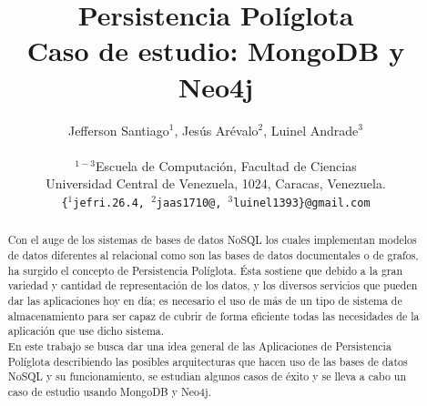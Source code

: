 \documentclass[conference]{IEEEtran}
\begin{document}
\title{Persistencia Pol\'iglota\\Caso de estudio: MongoDB y Neo4j}

\author{
Jefferson Santiago$^{1}$, Jes\'us Ar\'evalo$^{2}$, Luinel Andrade$^{3}$\\ \\
\small{$^{1-3}$Escuela de Computaci\'on, Facultad de Ciencias}\\
\small{Universidad Central de Venezuela, 1024, Caracas, Venezuela.}\\
\small{\texttt{\{$^{1}$jefri.26.4, $^{2}$jaas1710@, $^{3}$luinel1393\}@gmail.com}} %
}


\maketitle


\begin{abstract}
Con el auge de los sistemas de bases de datos NoSQL los cuales implementan modelos de datos diferentes al relacional como son las bases de datos documentales o de grafos, ha surgido el concepto  de Persistencia Pol\'iglota. \'Esta sostiene que debido a la gran variedad y cantidad de representación de los datos, y los diversos servicios que pueden dar las aplicaciones hoy en d\'ia; es necesario el uso de m\'as de un tipo de sistema de almacenamiento para ser capaz de cubrir de forma eficiente todas las necesidades de la aplicaci\'on que use dicho sistema.\\
En este trabajo se busca dar una idea general de las Aplicaciones de Persistencia Pol\'iglota describiendo las posibles arquitecturas  que hacen uso de las bases de datos NoSQL y su funcionamiento, se estudian algunos casos de \'exito  y se lleva a cabo un caso de estudio usando MongoDB y Neo4j.

\end{abstract}
\end{document}
